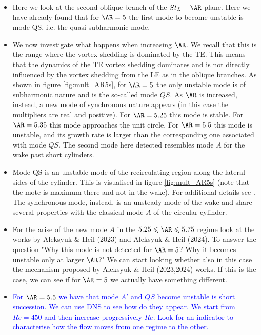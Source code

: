 \begin{itemize}
  \item Here we look at the second oblique branch of the $St_L-\AR$ plane. Here we have already found that for $\AR=5$ the first mode to become unstable is mode QS, i.e. the quasi-subharmonic mode.
  \item We now investigate what happens when increasing $\AR$. We recall that this is the range where the vortex shedding is dominated by the TE. This means that the dynamics of the TE vortex shedding dominates and is not directly influenced by the vortex shedding from the LE as in the oblique branches. As shown in figure \ref{fig:mult_AR5s}, for $\AR=5$ the only unstable mode is of subharmonic nature and is the so-called mode $QS$. As $\AR$ is increased, instead, a new mode of synchronous nature appears (in this case the multipliers are real and positive). For $\AR=5.25$ this mode is stable. For $\AR=5.35$ this mode approaches the unit circle. For $\AR=5.5$ this mode is unstable, and its growth rate is larger than the corresponding one associated with mode $QS$. The second mode here detected resembles mode $A$ for the wake past short cylinders. 
  \item Mode QS is an unstable mode of the recirculating region along the lateral sides of the cylinder. This is visualised in figure \ref{fig:mult_AR5s} (note that the mote is maximum there and not in the wake). For additional details see \citep{chiarini-etal-2022}. The synchronous mode, instead, is an unsteady mode of the wake and share several properties with the classical mode $A$ of the circular cylinder.
  \item For the arise of the new mode $A$ in the $5.25 \le \AR \le 5.75$ regime look at the works by Aleksyuk \& Heil (2023) and Aleksyuk \& Heil (2024). To answer the question "Why this mode is not detected for $\AR=5$? Why it becomes unstable only at larger $\AR$?" We can start looking whether also in this case the mechanism proposed by Aleksyuk \& Heil (2023,2024) works. If this is the case, we can see if for $\AR=5$ we actually have something different. 
  \item \textcolor{blue}{For $\AR=5.5$ we have that mode $A'$ and $QS$ become unstable is short succession. We can use DNS to see how do they appear. We start from $Re=450$ and then increase progressively $Re$. Look for an indicator to characterise how the flow moves from one regime to the other.}
\end{itemize}



